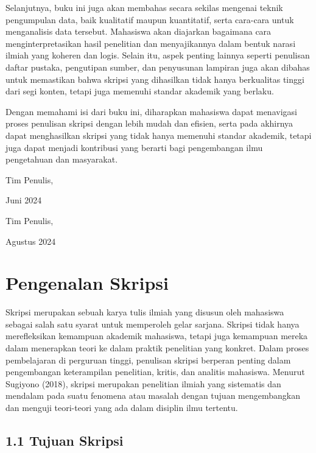 \documentclass[
  indonesian,
  letterpaper,
  DIV=11,
  numbers=noendperiod]{scrreprt}
\begin{document}
Selanjutnya, buku ini juga akan membahas secara sekilas mengenai teknik
pengumpulan data, baik kualitatif maupun kuantitatif, serta cara-cara
untuk menganalisis data tersebut. Mahasiswa akan diajarkan bagaimana
cara menginterpretasikan hasil penelitian dan menyajikannya dalam bentuk
narasi ilmiah yang koheren dan logis. Selain itu, aspek penting lainnya
seperti penulisan daftar pustaka, pengutipan sumber, dan penyusunan
lampiran juga akan dibahas untuk memastikan bahwa skripsi yang
dihasilkan tidak hanya berkualitas tinggi dari segi konten, tetapi juga
memenuhi standar akademik yang berlaku.

Dengan memahami isi dari buku ini, diharapkan mahasiswa dapat menavigasi
proses penulisan skripsi dengan lebih mudah dan efisien, serta pada
akhirnya dapat menghasilkan skripsi yang tidak hanya memenuhi standar
akademik, tetapi juga dapat menjadi kontribusi yang berarti bagi
pengembangan ilmu pengetahuan dan masyarakat.

Tim Penulis,

Juni 2024

Tim Penulis,

Agustus 2024


\chapter*{Pengenalan Skripsi}\label{pengenalan-skripsi}


Skripsi merupakan sebuah karya tulis ilmiah yang disusun oleh mahasiswa
sebagai salah satu syarat untuk memperoleh gelar sarjana. Skripsi tidak
hanya merefleksikan kemampuan akademik mahasiswa, tetapi juga kemampuan
mereka dalam menerapkan teori ke dalam praktik penelitian yang konkret.
Dalam proses pembelajaran di perguruan tinggi, penulisan skripsi
berperan penting dalam pengembangan keterampilan penelitian, kritis, dan
analitis mahasiswa. Menurut Sugiyono (2018), skripsi merupakan
penelitian ilmiah yang sistematis dan mendalam pada suatu fenomena atau
masalah dengan tujuan mengembangkan dan menguji teori-teori yang ada
dalam disiplin ilmu tertentu.

\section*{1.1 Tujuan Skripsi}\label{tujuan-skripsi}
\end{document}
